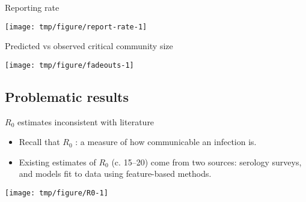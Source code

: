 \begin{frame}[fragile]{Reporting rate}
\begin{knitrout}\small
{}\color{fgcolor}

{\centering \texttt{[image: tmp/figure/report-rate-1]} 

}


\end{knitrout}
\end{frame}


\begin{frame}[fragile]{Predicted vs observed critical community size}
\begin{knitrout}\small
{}\color{fgcolor}

{\centering \texttt{[image: tmp/figure/fadeouts-1]} 

}


\end{knitrout}
\end{frame}

\subsection{Problematic results}

\begin{frame}[fragile]{$R_0$ estimates inconsistent with literature}
  \begin{itemize}
  \item Recall that $R_0$ : a measure of how communicable an infection is.
  \item Existing estimates of $R_0$ (c. 15--20) come from two sources: serology surveys, and models fit to data using feature-based methods.
  \end{itemize}
\begin{knitrout}\small
{}\color{fgcolor}

{\centering \texttt{[image: tmp/figure/R0-1]} 

}


\end{knitrout}
\end{frame}


